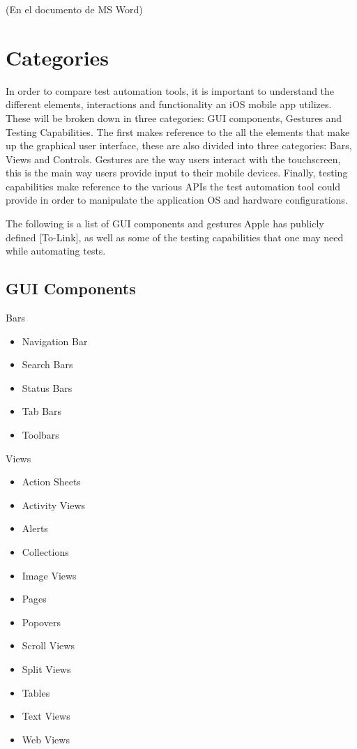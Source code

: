 (En el documento de MS Word)

\section{Categories}
In order to compare test automation tools, it is important to understand the different elements, interactions and functionality an iOS mobile app utilizes. These will be broken down in three categories: GUI components, Gestures and Testing Capabilities. The first makes reference to the all the elements that make up the graphical user interface, these are also divided into three categories: Bars, Views and Controls. Gestures are the way users interact with the touchscreen, this is the main way users provide input to their mobile devices. Finally, testing capabilities make reference to the various APIs the test automation tool could provide in order to manipulate the application OS and hardware configurations.

The following is a list of GUI components and gestures Apple has publicly defined [To-Link], as well as some of the testing capabilities that one may need while automating tests. 

\subsection {GUI Components}
	
	Bars
	\begin{itemize}
  		\item Navigation Bar
  		\item Search Bars
		\item Status Bars
		\item Tab Bars
		\item Toolbars
	\end{itemize}

	Views
	\begin{itemize}
  		\item Action Sheets
		\item Activity Views
		\item Alerts
		\item Collections
		\item Image Views
		\item Pages
		\item Popovers
		\item Scroll Views
		\item Split Views
		\item Tables
		\item Text Views
		\item Web Views
	\end{itemize}
	
